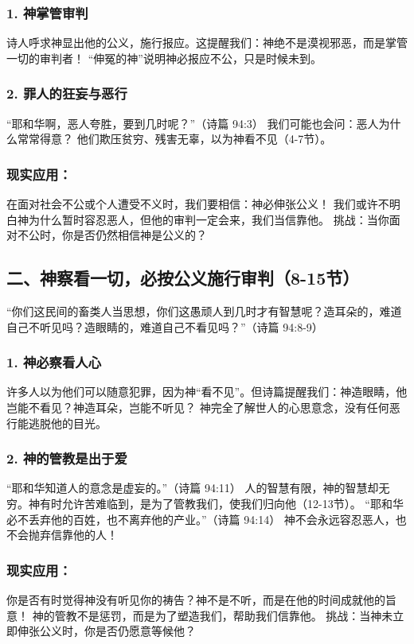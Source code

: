 \documentclass[a4paper, 12pt]{article}
\begin{document}
\subsubsection*{1. 神掌管审判}
诗人呼求神显出他的公义，施行报应。这提醒我们：神绝不是漠视邪恶，而是掌管一切的审判者！
“伸冤的神”说明神必报应不公，只是时候未到。
\subsubsection*{2. 罪人的狂妄与恶行}
“耶和华啊，恶人夸胜，要到几时呢？”（诗篇 94:3）
我们可能也会问：恶人为什么常常得意？
他们欺压贫穷、残害无辜，以为神看不见（4-7节）。
\subsubsection*{现实应用：}

在面对社会不公或个人遭受不义时，我们要相信：神必伸张公义！
我们或许不明白神为什么暂时容忍恶人，但他的审判一定会来，我们当信靠他。
挑战：当你面对不公时，你是否仍然相信神是公义的？

\subsection*{二、神察看一切，必按公义施行审判（8-15节）}
“你们这民间的畜类人当思想，你们这愚顽人到几时才有智慧呢？造耳朵的，难道自己不听见吗？造眼睛的，难道自己不看见吗？”（诗篇 94:8-9）

\subsubsection*{1. 神必察看人心}
许多人以为他们可以随意犯罪，因为神“看不见”。但诗篇提醒我们：神造眼睛，他岂能不看见？神造耳朵，岂能不听见？
神完全了解世人的心思意念，没有任何恶行能逃脱他的目光。
\subsubsection*{2. 神的管教是出于爱}
“耶和华知道人的意念是虚妄的。”（诗篇 94:11）
人的智慧有限，神的智慧却无穷。神有时允许苦难临到，是为了管教我们，使我们归向他（12-13节）。
“耶和华必不丢弃他的百姓，也不离弃他的产业。”（诗篇 94:14）
神不会永远容忍恶人，也不会抛弃信靠他的人！
\subsubsection*{现实应用：}

你是否有时觉得神没有听见你的祷告？神不是不听，而是在他的时间成就他的旨意！
神的管教不是惩罚，而是为了塑造我们，帮助我们信靠他。
挑战：当神未立即伸张公义时，你是否仍愿意等候他？
\end{document}
